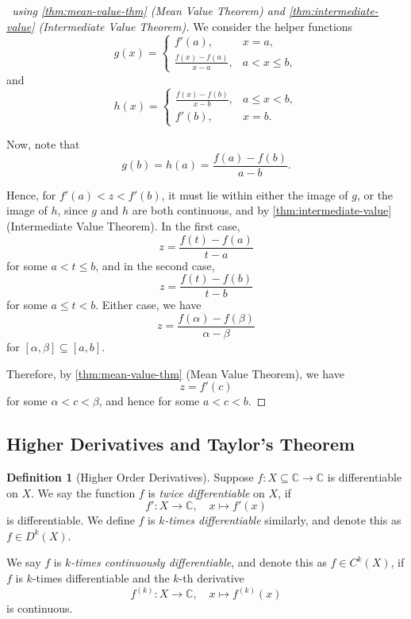 \documentclass[11pt]{article}
\numberwithin{equation}{section}
\theoremstyle{definition}
\newtheorem{definition}[theorem]{Definition}
\theoremstyle{remark}
\newcommand{\pqty}[1]{\left(#1\right)}
\newcommand{\ccintv}[2]{[#1,#2]}
\newcommand{\functiondomain}[3]{#1:#2\to #3}
\newcommand{\function}[5]{#1:#2\to #3,\quad #4\mapsto #5}
\newcommand{\CC}{\mathbb C}
\newcommand{\contClass}[1]{C^{#1}}
\newcommand{\diffClass}[1]{D^{#1}}
\begin{document}
\begin{proof}[\proofname\ using \autoref{thm:mean-value-thm} (Mean Value Theorem) and \autoref{thm:intermediate-value} (Intermediate Value Theorem)]
    We consider the helper functions
    \[
        g\pqty{x} = \begin{cases}
            f'\pqty{a}, & x = a, \\
            \frac{f\pqty{x} - f\pqty{a}}{x - a}, & a < x \leq b,
        \end{cases}
    \]
    and
    \[
        h\pqty{x} = \begin{cases}
            \frac{f\pqty{x} - f\pqty{b}}{x - b}, & a \leq x < b, \\
            f'\pqty{b}, & x = b.
        \end{cases}
    \]

    Now, note that
    \[
        g\pqty{b} = h\pqty{a} = \frac{f\pqty{a} - f\pqty{b}}{a - b}.
    \]

    Hence, for \(f'\pqty{a} < z < f'\pqty{b}\), it must lie within either the image of \(g\), or the image of \(h\), since \(g\) and \(h\) are both continuous, and by \autoref{thm:intermediate-value} (Intermediate Value Theorem). In the first case,
    \[
        z = \frac{f\pqty{t} - f\pqty{a}}{t - a}
    \]
    for some \(a < t \leq b\), and in the second case,
    \[
        z = \frac{f\pqty{t} - f\pqty{b}}{t - b}
    \]  
    for some \(a \leq t < b\). Either case, we have
    \[
        z = \frac{f\pqty{\alpha} - f\pqty{\beta}}{\alpha - \beta}
    \]
    for \(\ccintv{\alpha}{\beta} \subseteq \ccintv{a}{b}\).

    Therefore, by \autoref{thm:mean-value-thm} (Mean Value Theorem), we have
    \[
        z = f' \pqty{c}  
    \]
    for some \(\alpha < c < \beta\), and hence for some \(a < c < b\).
\end{proof}

\subsection{Higher Derivatives and Taylor's Theorem}
\begin{definition}[Higher Order Derivatives]\label{analysis-unit-0124}
    \label{def:higher-order-derivatives}%
    Suppose \(\functiondomain{f}{X \subseteq \CC}{\CC}\) is differentiable on \(X\). We say the function \(f\) is \emph{twice differentiable} on \(X\), if
    \[
        \function{f'}{X}{\CC}{x}{f'\pqty{x}}
    \]
    is differentiable. We define \(f\) is \emph{\(k\)-times differentiable} similarly, and denote this as \(f \in \diffClass{k} \pqty{X}\).

    We say \(f\) is \emph{\(k\)-times continuously differentiable}, and denote this as \(f \in \contClass{k} \pqty{X}\), if \(f\) is \(k\)-times differentiable and the \(k\)-th derivative
    \[
        \function{f^{\pqty{k}}}{X}{\CC}{x}{f^{\pqty{k}}\pqty{x}}
    \]
    is continuous.
\end{definition}
\end{document}
